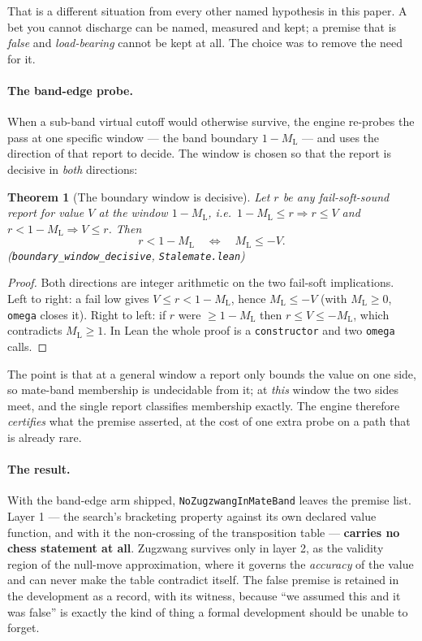 \documentclass[11pt]{article}
\newcommand{\ML}{M_{\mathrm{L}}}    %
\newcommand{\leanref}[2]{(\texttt{#1}, \texttt{#2})}%
\theoremstyle{plain}
\newtheorem{theorem}{Theorem}[section]
\theoremstyle{definition}
\theoremstyle{remark}
\begin{document}
That is a different situation from every other named hypothesis in this
paper.  A bet you cannot discharge can be named, measured and kept; a
premise that is \emph{false} and \emph{load-bearing} cannot be kept at
all.  The choice was to remove the need for it.

\paragraph{The band-edge probe.}
When a sub-band virtual cutoff would otherwise survive, the engine
re-probes the pass at one specific window --- the band boundary
$1 - \ML$ --- and uses the direction of that report to decide.  The
window is chosen so that the report is decisive in \emph{both}
directions:

\begin{theorem}[The boundary window is decisive]
\label{thm:bandedge}
Let $r$ be any fail-soft-sound report for value $V$ at the window
$1 - \ML$, i.e.\ $1 - \ML \le r \Rightarrow r \le V$ and
$r < 1 - \ML \Rightarrow V \le r$.  Then
\[
  r < 1 - \ML \quad\Longleftrightarrow\quad \ML \le -V .
\]
\leanref{boundary\_window\_decisive}{Stalemate.lean}
\end{theorem}

\begin{proof}
Both directions are integer arithmetic on the two fail-soft
implications.  Left to right: a fail low gives $V \le r < 1 - \ML$,
hence $\ML \le -V$ (with $\ML \ge 0$, \texttt{omega} closes it).  Right
to left: if $r$ were $\ge 1 - \ML$ then $r \le V \le -\ML$, which
contradicts $\ML \ge 1$.  In Lean the whole proof is a
\texttt{constructor} and two \texttt{omega} calls.
\end{proof}

The point is that at a general window a report only bounds the value on
one side, so mate-band membership is undecidable from it; at
\emph{this} window the two sides meet, and the single report classifies
membership exactly.  The engine therefore \emph{certifies} what the
premise asserted, at the cost of one extra probe on a path that is
already rare.

\paragraph{The result.}
With the band-edge arm shipped, \texttt{NoZugzwangInMateBand} leaves the
premise list.  Layer 1 --- the search's bracketing property against its
own declared value function, and with it the non-crossing of the
transposition table --- \textbf{carries no chess statement at all}.
Zugzwang survives only in layer 2, as the validity region of the
null-move approximation, where it governs the \emph{accuracy} of the
value and can never make the table contradict itself.  The false
premise is retained in the development as a record, with its witness,
because ``we assumed this and it was false'' is exactly the kind of
thing a formal development should be unable to forget.
\end{document}

